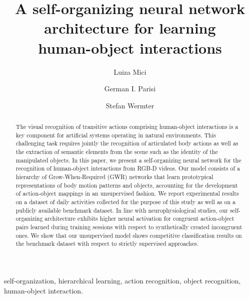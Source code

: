 \documentclass[5p,times]{elsarticle}
\begin{document}
\begin{frontmatter}


\title{A self-organizing neural network architecture for learning \\human-object interactions}

\author{Luiza Mici}

\author{German I. Parisi}

\author{Stefan Wermter}

\address{Knowledge Technology, Department of Informatics, University of Hamburg, Germany}

\begin{abstract}
The visual recognition of transitive actions comprising human-object interactions is a key component for artificial systems operating in natural environments.
This challenging task requires jointly the recognition of articulated body actions as well as the extraction of semantic elements from the scene such as the identity of the manipulated objects. 
In this paper, we present a self-organizing neural network for the recognition of human-object interactions from RGB-D videos. 
Our model consists of a hierarchy of Grow-When-Required (GWR) networks that learn prototypical representations of body motion patterns and objects, accounting for the development of action-object mappings in an unsupervised fashion.
We report experimental results on a dataset of daily activities collected for the purpose of this study as well as on a publicly available benchmark dataset.
In line with neurophysiological studies, our self-organizing architecture exhibits higher neural activation for congruent  action-object pairs learned during training sessions with respect to synthetically created incongruent ones.
We show that our unsupervised model shows competitive classification results on the benchmark dataset with respect to strictly supervised approaches.
\end{abstract}

\begin{keyword}
self-organization, hierarchical learning, action recognition, object recognition, human-object interaction.
\end{keyword}

\end{frontmatter}
\end{document}
